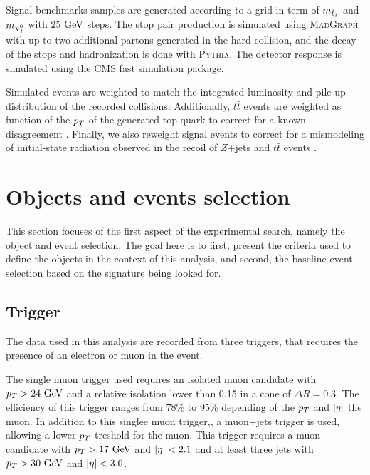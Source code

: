     Signal benchmarks samples are generated according to a grid in term of $m_{\tilde{t}_1}$
    and $m_{\tilde{\chi}_1^0}$ with $25~\text{GeV}$ steps. The stop pair production is simulated
    using \textsc{MadGraph} with up to two additional partons generated in the hard collision,
    and the decay of the stops and hadronization is done with \textsc{Pythia}. The detector
    response is simulated using the CMS fast simulation package. 

    Simulated events are weighted to match the integrated luminosity and pile-up distribution
    of the recorded collisions. Additionally, $t\bar{t}$ events are weighted as function of 
    the $p_T$ of the generated top quark to correct for a known disagreement . 
    Finally, we also reweight signal events to correct for a mismodeling of initial-state 
    radiation observed in the recoil of $Z$+jets and $t\bar{t}$ events \cite{ISRmodelingDominick}.

    \section{Objects and events selection \label{sec:analysis_objectAndEventSelection}}

    This section focuses of the first aspect of the experimental search, namely the object 
    and event selection. The goal here is to first, present the criteria used to define the
    objects in the context of this analysis, and second, the baseline event selection based 
    on the signature being looked for.

        \subsection{Trigger}

    The data used in this analysis are recorded from three triggers, that requires the
    presence of an electron or muon in the event.
    
    The single muon trigger used requires an isolated muon candidate with $p_T > 24~\text{GeV}$ 
    and a relative isolation lower than 0.15 in a cone of $\Delta R = 0.3$. The efficiency 
    of this trigger ranges from 78\% to 95\% depending of the $p_T$ and $\left| \eta \right|$ the muon.
    In addition to this singlee muon trigger,, a muon+jets trigger is used, allowing a 
    lower $p_T$ treshold for the muon. This trigger requires a muon candidate with 
    $p_T > 17~\text{GeV}$ and $\left| \eta \right| < 2.1$ and at least three jets with $p_T > 30~\text{GeV}$ and 
    $\left| \eta \right| < 3.0$.  

